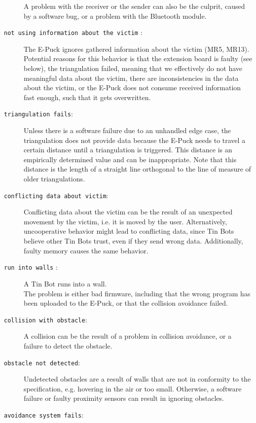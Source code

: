 \documentclass[a4paper,parskip,headheight=38pt]{scrartcl} %
\begin{document}
\begin{description}
    A problem with the receiver or the sender can also be the culprit, caused by a software bug, or a problem with the Bluetooth module. %
\item[\texttt{not using information about the victim} \refpdf{ignorevictim}:]
    The E-Puck ignores gathered information about the victim (MR5, MR13). \\
    Potential reasons for this behavior is that the extension board is faulty (see below), the triangulation failed, meaning that we effectively do not have meaningful data about the victim, there are inconsistencies in the data about the victim, or the E-Puck does not consume received information fast enough, such that it gets overwritten.
\item[\texttt{triangulation fails}:]
    Unless there is a software failure due to an unhandled edge case, the triangulation does not provide data because the E-Puck needs to travel a certain distance until a triangulation is triggered. 
    This distance is an empirically determined value and can be inappropriate. 
    Note that this distance is the length of a straight line orthogonal to the line of measure of older triangulations.
\item[\texttt{conflicting data about victim}:]
    Conflicting data about the victim can be the result of an unexpected movement by the victim, i.e. it is moved by the user. 
    Alternatively, uncooperative behavior might lead to conflicting data, since Tin Bots believe other Tin Bots trust, even if they send wrong data. 
    Additionally, faulty memory causes the same behavior.
\item[\texttt{run into walls} \refpdf{runintowall}:]
    A Tin Bot runs into a wall.\\
    The problem is either bad firmware, including that the wrong program has been uploaded to the E-Puck, or that the collision avoidance failed.
\item[\texttt{collision with obstacle}:]
    A collision can be the result of a problem in collision avoidance, or a failure to detect the obstacle.
\item[\texttt{obstacle not detected}:]
    Undetected obstacles are a result of walls that are not in conformity to the specification, e.g. hovering in the air or too small. 
    Otherwise, a software failure or faulty proximity sensors can result in ignoring obstacles.
\item[\texttt{avoidance system fails}:]

\end{description}
\end{document}
